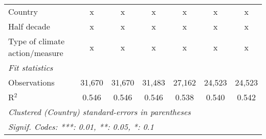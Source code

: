 \begin{tabular}{lcccccc}
   Country                                    & x       & x       & x       & x            & x             & x\\  
   Half decade                                & x       & x       & x       & x            & x             & x\\  
   Type of climate action/measure             & x       & x       & x       & x            & x             & x\\  
   \midrule \emph{Fit statistics}\\
   Observations                               & 31,670  & 31,670  & 31,483  & 27,162       & 24,523        & 24,523\\  
   R$^2$                                      & 0.546   & 0.546   & 0.546   & 0.538        & 0.540         & 0.542\\  
   \midrule
   \multicolumn{7}{l}{\emph{Clustered (Country) standard-errors in parentheses}}\\
   \multicolumn{7}{l}{\emph{Signif. Codes: ***: 0.01, **: 0.05, *: 0.1}}\\
\end{tabular}
\par\endgroup


